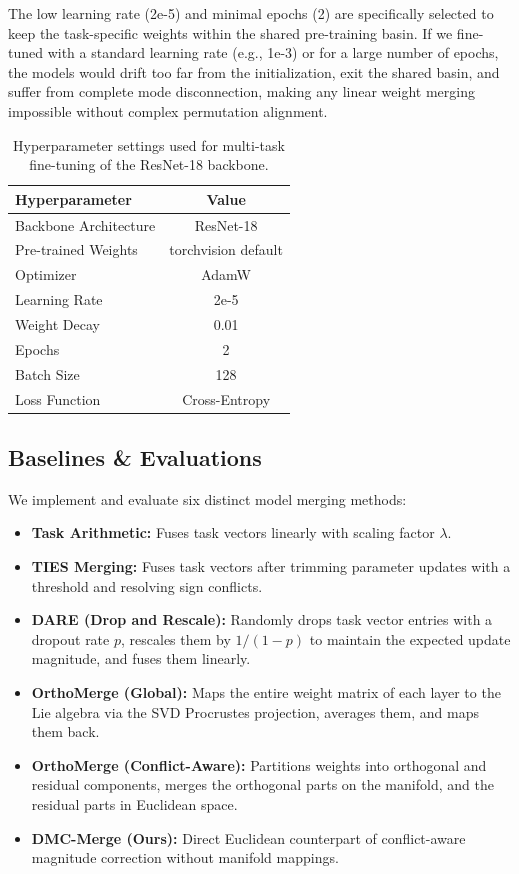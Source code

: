 \documentclass{article}
\begin{document}
The low learning rate (2e-5) and minimal epochs (2) are specifically selected to keep the task-specific weights within the shared pre-training basin. If we fine-tuned with a standard learning rate (e.g., 1e-3) or for a large number of epochs, the models would drift too far from the initialization, exit the shared basin, and suffer from complete mode disconnection, making any linear weight merging impossible without complex permutation alignment.

\begin{table}[h]
\caption{Hyperparameter settings used for multi-task fine-tuning of the ResNet-18 backbone.}
\label{tab:hyperparams}
\vskip 0.15in
\begin{center}
\begin{small}
\begin{tabular}{lc}
\toprule
\textbf{Hyperparameter} & \textbf{Value} \\
\midrule
Backbone Architecture & ResNet-18 \\
Pre-trained Weights & torchvision default \\
Optimizer & AdamW \\
Learning Rate & 2e-5 \\
Weight Decay & 0.01 \\
Epochs & 2 \\
Batch Size & 128 \\
Loss Function & Cross-Entropy \\
\bottomrule
\end{tabular}
\end{small}
\end{center}
\vskip -0.1in
\end{table}

\subsection{Baselines \& Evaluations}
We implement and evaluate six distinct model merging methods:
\begin{itemize}
\item \textbf{Task Arithmetic:} Fuses task vectors linearly with scaling factor $\lambda$.
\item \textbf{TIES Merging:} Fuses task vectors after trimming parameter updates with a threshold and resolving sign conflicts.
\item \textbf{DARE (Drop and Rescale):} Randomly drops task vector entries with a dropout rate $p$, rescales them by $1/(1-p)$ to maintain the expected update magnitude, and fuses them linearly.
\item \textbf{OrthoMerge (Global):} Maps the entire weight matrix of each layer to the Lie algebra via the SVD Procrustes projection, averages them, and maps them back.
\item \textbf{OrthoMerge (Conflict-Aware):} Partitions weights into orthogonal and residual components, merges the orthogonal parts on the manifold, and the residual parts in Euclidean space.
\item \textbf{DMC-Merge (Ours):} Direct Euclidean counterpart of conflict-aware magnitude correction without manifold mappings.
\end{itemize}
\end{document}
